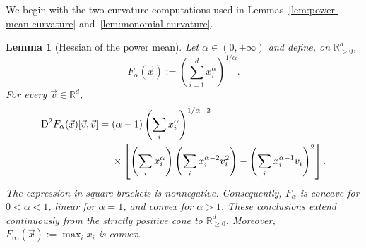 \documentclass[aps,pra,11pt,onecolumn,nofootinbib,tightenlines]{revtex4-2}
\newtheorem{lemma}[theorem]{Lemma}
\theoremstyle{definition}
\begin{document}
We begin with the two curvature computations used in Lemmas~\ref{lem:power-mean-curvature} and~\ref{lem:monomial-curvature}.

\begin{lemma}[Hessian of the power mean]
\label{lem:app-power-mean-hessian}
Let $\alpha\in(0,+\infty)$ and define, on $\mathbb R^d_{>0}$,
\begin{equation}
 F_\alpha(\vec x):=\left(\sum_{i=1}^d x_i^\alpha\right)^{1/\alpha}.
 \label{eq:app-F-alpha}
\end{equation}
For every $\vec v\in\mathbb R^d$,
\begin{align}
 \mathrm D^2F_\alpha(\vec x)[\vec v,\vec v]
 ={}&(\alpha-1)
 \left(\sum_i x_i^\alpha\right)^{1/\alpha-2}
 \notag\\
 &\times\left[
 \left(\sum_i x_i^\alpha\right)
 \left(\sum_i x_i^{\alpha-2}v_i^2\right)
 -\left(\sum_i x_i^{\alpha-1}v_i\right)^2
 \right].
 \label{eq:app-power-mean-Hessian}
\end{align}
The expression in square brackets is nonnegative.  Consequently, $F_\alpha$ is concave for $0<\alpha<1$, linear for $\alpha=1$, and convex for $\alpha>1$.  These conclusions extend continuously from the strictly positive cone to $\mathbb R^d_{\geq0}$.  Moreover, $F_\infty(\vec x):=\max_i x_i$ is convex.
\end{lemma}
\end{document}
